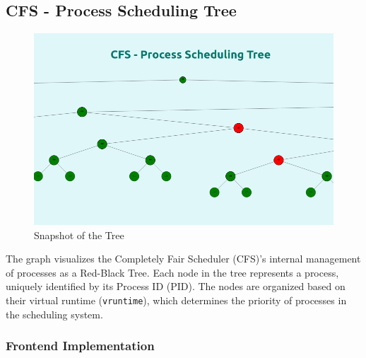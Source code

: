 \documentclass[12pt]{article}
\begin{document}
\subsection{CFS - Process Scheduling Tree}
\begin{figure}[H]
    \centering
    \begin{minipage}{0.8\textwidth}
        \centering
        \includegraphics[width=\textwidth]{logos and images/CFS_1.png}
    \end{minipage}
    \hfill
    
    \caption{Snapshot of the Tree}
\end{figure}
The graph visualizes the Completely Fair Scheduler (CFS)'s internal management of processes as a Red-Black Tree. Each node in the tree represents a process, uniquely identified by its Process ID (PID). The nodes are organized based on their virtual runtime (\texttt{vruntime}), which determines the priority of processes in the scheduling system.
\subsubsection{Frontend Implementation}



\end{document}
